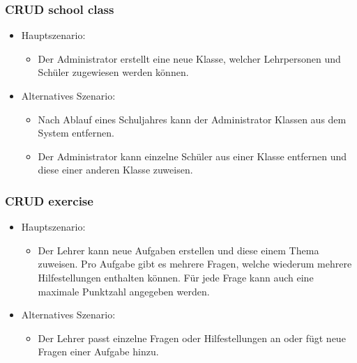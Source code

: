 \newpage

\subsubsection*{CRUD school class}

\begin{itemize}
	\item Hauptszenario:
	\begin{itemize}
		\item Der Administrator erstellt eine neue Klasse, welcher Lehrpersonen und Schüler zugewiesen werden können.
	\end{itemize}
	\item Alternatives Szenario:
	\begin{itemize}
		\item Nach Ablauf eines Schuljahres kann der Administrator Klassen aus dem System entfernen.
		\item Der Administrator kann einzelne Schüler aus einer Klasse entfernen und diese einer anderen Klasse zuweisen.
	\end{itemize}
\end{itemize}


\subsubsection*{CRUD exercise}
\begin{itemize}
	\item Hauptszenario:
	\begin{itemize}
		\item Der Lehrer kann neue Aufgaben erstellen und diese einem Thema zuweisen. Pro Aufgabe gibt es mehrere Fragen, welche wiederum mehrere Hilfestellungen enthalten können. Für jede Frage kann auch eine maximale Punktzahl angegeben werden. 
	\end{itemize}
	\item Alternatives Szenario:
	\begin{itemize}
		\item Der Lehrer passt einzelne Fragen oder Hilfestellungen an oder fügt neue Fragen einer Aufgabe hinzu.
	\end{itemize}
\end{itemize}



